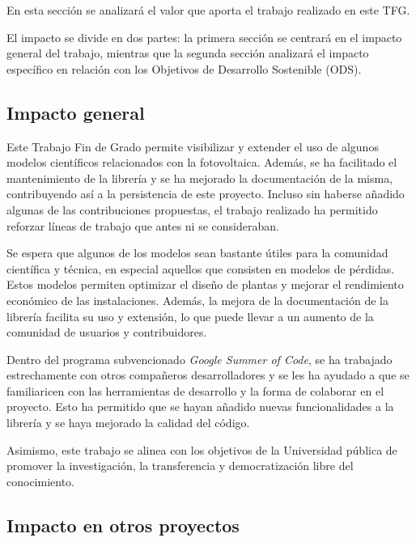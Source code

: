 En esta sección se analizará el valor que aporta el trabajo realizado en este TFG.

El impacto se divide en dos partes: la primera sección se centrará en el impacto general del trabajo, mientras que la segunda sección analizará el impacto específico en relación con los Objetivos de Desarrollo Sostenible (ODS).


\subsection{Impacto general} \label{sssct:impacto:general}

Este Trabajo Fin de Grado permite visibilizar y extender el uso de algunos modelos científicos relacionados con la fotovoltaica. Además, se ha facilitado el mantenimiento de la librería \pvlibpy{} y se ha mejorado la documentación de la misma, contribuyendo así a la persistencia de este proyecto. Incluso sin haberse añadido algunas de las contribuciones propuestas, el trabajo realizado ha permitido reforzar líneas de trabajo que antes ni se consideraban.

Se espera que algunos de los modelos sean bastante útiles para la comunidad científica y técnica, en especial aquellos que consisten en modelos de pérdidas. Estos modelos permiten optimizar el diseño de plantas y mejorar el rendimiento económico de las instalaciones. Además, la mejora de la documentación de la librería \pvlibpy{} facilita su uso y extensión, lo que puede llevar a un aumento de la comunidad de usuarios y contribuidores.

Dentro del programa subvencionado \textit{Google Summer of Code}, se ha trabajado estrechamente con otros compañeros desarrolladores y se les ha ayudado a que se familiaricen con las herramientas de desarrollo y la forma de colaborar en el proyecto. Esto ha permitido que se hayan añadido nuevas funcionalidades a la librería y se haya mejorado la calidad del código.

Asimismo, este trabajo se alinea con los objetivos de la Universidad pública de promover la investigación, la transferencia y democratización libre del conocimiento.


\subsection{Impacto en otros proyectos} \label{sssct:impacto:otrosproyectos}

